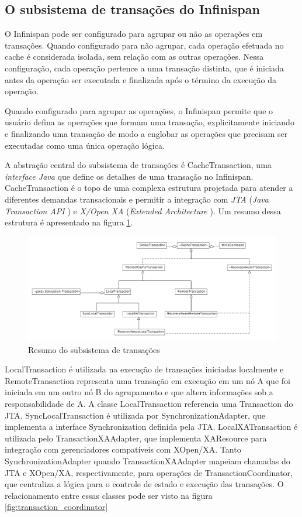 \documentclass[11pt,twoside,a4paper]{book}
\begin{document}
\subsection{O subsistema de transações do Infinispan}
\label{sec:tx_infinispan}
O Infinispan pode ser configurado para agrupar ou não as operações em transações. Quando configurado para não agrupar, cada operação efetuada no cache é considerada isolada, sem relação com as outras operações. Nessa configuração, cada operação pertence a uma transação distinta, que é iniciada antes da operação ser executada e finalizada após o término da execução da operação.

Quando configurado para agrupar as operações, o Infinispan permite que o usuário defina as operações que formam uma transação, explicitamente iniciando e finalizando uma transação de modo a englobar as operações que precisam ser executadas como uma única operação lógica.

A abstração central do subsistema de transações é CacheTransaction, uma \emph{interface Java} \cite{java} que define os detalhes de uma transação no Infinispan. CacheTransaction é o topo de uma complexa estrutura projetada para atender a diferentes demandas transacionais e permitir a integração com \emph{JTA} (\emph{Java Transaction API} \cite{jta}) e \emph{X/Open XA} (\emph{Extended Architecture} \cite{xa}). Um resumo dessa estrutura é apresentado na figura \ref{fig:subsistema_transacoes}.

\begin{figure}
  \centering
  \includegraphics[width=\textwidth]{subsistema_transacoes} 
  \caption{Resumo do subsistema de transações}
  \label{fig:subsistema_transacoes} 
\end{figure}

LocalTransaction é utilizada na execução de transações iniciadas localmente e RemoteTransaction representa uma transação em execução em um nó A que foi iniciada em um outro nó B do agrupamento e que altera informações sob a responsabilidade de A. A classe LocalTransaction referencia uma Transaction do JTA. SyncLocalTransaction é utilizada por SynchronizationAdapter, que implementa a interface Synchronization definida pela JTA. LocalXATransaction é utilizada pelo TransactionXAAdapter, que implementa XAResource para integração com gerenciadores compatíveis com XOpen/XA. Tanto SynchronizationAdapter quando TransactionXAAdapter mapeiam chamadas do JTA e XOpen/XA, respectivamente, para operações de TransactionCoordinator, que centraliza a lógica para o controle de estado e execução das transações. O relacionamento entre essas classes pode ser visto na figura \ref{fig:transaction_coordinator}
\end{document}
